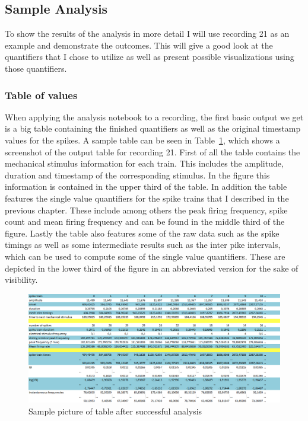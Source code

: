 \subsection{Sample Analysis}
To show the results of the analysis in more detail I will use recording 21 as an example and demonstrate the outcomes. This will give a good look at the quantifiers that I chose to utilize as well as present possible visualizations using those quantifiers.

\subsubsection{Table of values}
When applying the analysis notebook to a recording, the first basic output we get is a big table containing the finished quantifiers as well as the original timestamp values for the spikes. A sample table can be seen in Table~\ref{fig:table_sc}, which shows a screenshot of the output table for recording 21.
First of all the table contains the mechanical stimulus information for each train. This includes the amplitude, duration and timestamp of the corresponding stimulus. In the figure this information is contained in the upper third of the table.
In addition the table features the single value quantifiers for the spike trains that I described in the previous chapter. These include among others the peak firing frequency, spike count and mean firing frequency and can be found in the middle third of the figure.
Lastly the table also features some of the raw data such as the spike timings as well as some intermediate results such as the inter pike intervals, which can be used to compute some of the single value quantifiers. These are depicted in the lower third of the figure in an abbreviated version for the sake of visibility.\\
\begin{figure}
	\includegraphics[width = \textwidth]{src/pic/sc_table}
	\caption{Sample picture of table after successful analysis }
	\label{fig:table_sc}
\end{figure}




